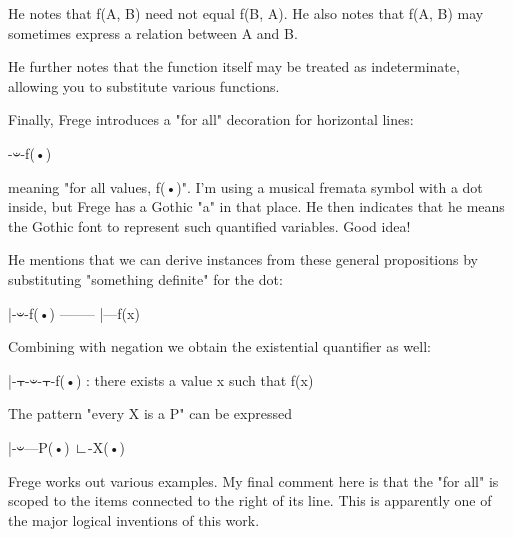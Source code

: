He notes that f(A, B) need not equal f(B, A). He also notes that f(A, B) may sometimes express a relation between A and B.

He further notes that the function itself may be treated as indeterminate, allowing you to substitute various functions.

Finally, Frege introduces a "for all" decoration for horizontal lines:

-𝄑-f(•)

meaning "for all values, f(•)". I'm using a musical fremata symbol with a dot inside, but Frege has a Gothic "a" in that place. He then indicates that he means the Gothic font to represent such quantified variables. Good idea!

He mentions that we can derive instances from these general propositions by substituting "something definite" for the dot:

|-𝄑-f(•)
--------
|---f(x)

Combining with negation we obtain the existential quantifier as well:

|-⫟-𝄑-⫟-f(•) : there exists a value x such that f(x)

The pattern "every X is a P" can be expressed

|-𝄑---P(•)
    ∟-X(•)

Frege works out various examples. My final comment here is that the "for all" is scoped to the items connected to the right of its line. This is apparently one of the major logical inventions of this work.






